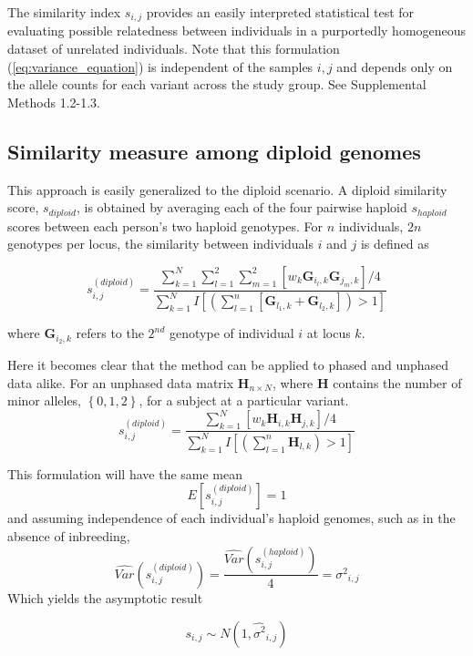 The similarity index $s_{i,j}$ provides an easily interpreted statistical
test for evaluating possible relatedness between individuals in a
purportedly homogeneous dataset of unrelated individuals. Note that
this formulation (\ref{eq:variance_equation}) is independent of the samples $i,j$ and depends
only on the allele counts for each variant across the study group.
See Supplemental Methods 1.2-1.3.

\subsection{Similarity measure among diploid genomes}

This approach is easily generalized to the diploid scenario. A diploid
similarity score, $s_{diploid}$, is obtained by averaging each of
the four pairwise haploid $s_{haploid}$ scores between each person's
two haploid genotypes. For $n$ individuals, $2n$ genotypes per locus,
the similarity between individuals $i$ and $j$ is defined as

\[
s_{i,j}^{\left(diploid\right)}=\frac{\sum_{k=1}^{N}\sum_{l=1}^{2}\sum_{m=1}^{2}\left[w_{k}\mathbf{G}_{i_{l},k}\mathbf{G}_{j_{m},k}\right]/4}{\sum_{k=1}^{N}I\left[\left(\sum_{l=1}^{n}\left[\mathbf{G}_{l_{1},k}+\mathbf{G}_{l_{2},k}\right]\right)>1\right]}
\]

where $\mathbf{G}_{i_{2},k}$ refers to the $2^{nd}$ genotype of
individual $i$ at locus $k$.

Here it becomes clear that the method can be applied to phased and
unphased data alike. For an unphased data matrix $\mathbf{H}_{n\times N}$,
where $\mathbf{H}$ contains the number of minor alleles, $\left\{ 0,1,2\right\} $,
for a subject at a particular variant. 
\[
s_{i,j}^{\left(diploid\right)}=\frac{\sum_{k=1}^{N}\left[w_{k}\mathbf{H}_{i,k}\mathbf{H}_{j,k}\right]/4}{\sum_{k=1}^{N}I\left[\left(\sum_{l=1}^{n}\mathbf{H}_{l,k}\right)>1\right]}
\]

This formulation will have the same mean
\[
E\left[s_{i,j}^{\left(diploid\right)}\right]=1
\]
and assuming independence of each individual's haploid genomes, such
as in the absence of inbreeding,
\[
\hat{Var}\left(s_{i,j}^{\left(diploid\right)}\right)=\frac{\hat{Var}\left(s_{i,j}^{\left(haploid\right)}\right)}{4}=\hat{\sigma^{2}}_{i,j}
\]
Which yields the asymptotic result

\begin{equation}
s_{i,j}\sim N\left(1,\hat{\sigma^{2}}_{i,j}\right)\label{eq:null_distribution}
\end{equation}


